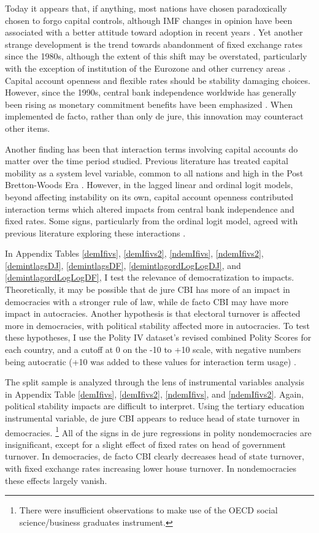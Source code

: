 \documentclass{article}
\begin{document}
    Today it appears that, if anything, most nations have chosen paradoxically chosen to forgo capital controls, although IMF changes in opinion have been associated with a better attitude toward adoption in recent years \citep{gallagher_capital_2010}. Yet another strange development is the trend towards abandonment of fixed exchange rates since the 1980s, although the extent of this shift may be overstated, particularly with the exception of institution of the Eurozone and other currency areas \citep{ilzetzki_exchange_2017}. Capital account openness and flexible rates should be stability damaging choices. However, since the 1990s, central bank independence worldwide has generally been rising as monetary commitment benefits have been emphasized \citep{jones_rethinking_2019}. When implemented de facto, rather than only de jure, this innovation may counteract other items.
    
    Another finding has been that interaction terms involving capital accounts do matter over the time period studied. Previous literature has treated capital mobility as a system level variable, common to all nations and high in the Post Bretton-Woods Era \citep{clark_monetary_2013}. However, in the lagged linear and ordinal logit models, beyond affecting instability on its own, capital account openness contributed interaction terms which altered impacts from central bank independence and fixed rates. Some signs, particularly from the ordinal logit model, agreed with previous literature exploring these interactions \citep{bernhard_political_2002-1}.

    In Appendix Tables \ref*{demIfivs}, \ref*{demIfivs2}, \ref*{ndemIfivs}, \ref*{ndemIfivs2}, \ref*{demintlagsDJ}, \ref{demintlagsDF}, \ref{demintlagordLogLogDJ}, and \ref{demintlagordLogLogDF}, I test the relevance of democratization to impacts. Theoretically, it may be possible that de jure CBI has more of an impact in democracies with a stronger rule of law, while de facto CBI may have more impact in autocracies. Another hypothesis is that electoral turnover is affected more in democracies, with political stability affected more in autocracies. To test these hypotheses, I use the Polity IV dataset’s revised combined Polity Scores for each country, and a cutoff at 0 on the -10 to +10 scale, with negative numbers being autocratic (+10 was added to these values for interaction term usage) \citep{polity_project_polity_2019}.

    The split sample is analyzed through the lens of instrumental variables analysis in Appendix Table \ref*{demIfivs}, \ref*{demIfivs2}, \ref{ndemIfivs}, and \ref*{ndemIfivs2}. Again, political stability impacts are difficult to interpret. Using the tertiary education instrumental variable, de jure CBI appears to reduce head of state turnover in democracies. \footnote{There were insufficient observations to make use of the OECD social science/business graduates instrument.} All of the signs in de jure regressions in polity nondemocracies are insignificant, except for a slight effect of fixed rates on head of government turnover. In democracies, de facto CBI clearly decreases head of state turnover, with fixed exchange rates increasing lower house turnover. In nondemocracies these effects largely vanish.
\end{document}
